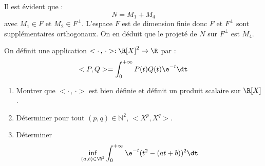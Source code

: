\documentclass[a4paper,10pt]{report}
\begin{document}
\begin{enumerate}
\medskip

\noindent Il est évident que :
$$ N= M_1+M_4$$
avec $M_1 \in F$ et $M_2 \in F^{\perp}$. L'espace $F$ est de dimension finie donc $F$ et $F^{\perp}$ sont supplémentaires orthogonaux. On en déduit que le projeté de $N$ sur $F^{\perp}$ est $M_4$.
\end{enumerate}

\begin{Exa} On définit une application $< \cdot \, , \, \cdot> : \R[X]^2 \rightarrow \R$ par :
  \[
 <P,Q> = \int_{0}^{ + \infty} P(t)Q(t)\e^{ - t} \dt
  \]
  \begin{enumerate}
  \item Montrer que $< \cdot \, , \, \cdot>$ est bien définie et définit un produit scalaire sur $\R[X]$.
  \item Déterminer pour tout $(p,q) \in \mathbb{N}^2$, $<X^{p} ,X^{q}>$.
  \item Déterminer
    \[
    \inf_{(a,b) \in \R^{2}} \int_{0}^{ + \infty} \e^{ - t}(t^{2} - (at + b))^{2} \dt
    \]
  \end{enumerate}
\end{Exa}

\corr 
\end{document}

